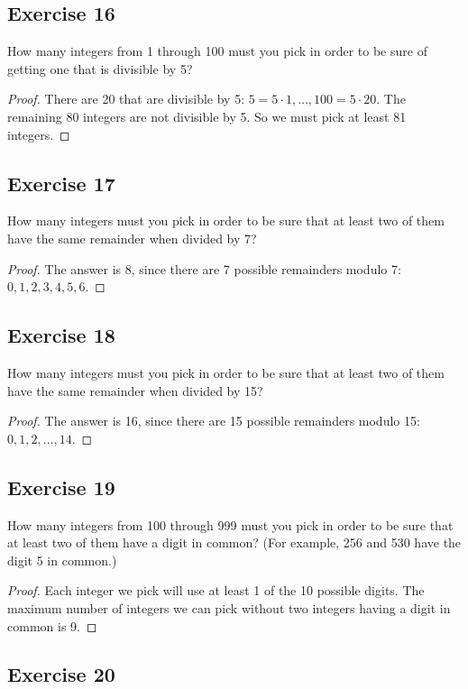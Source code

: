\documentclass[14pt]{extarticle}
\begin{document}
\subsection{Exercise 16}
How many integers from 1 through 100 must you pick in order to be sure of getting one that is divisible by 5?

\begin{proof}
There are 20 that are divisible by 5: \(5 = 5 \cdot 1, \ldots, 100 = 5 \cdot 20\). The remaining 80 integers are
not divisible by 5. So we must pick at least 81 integers.
\end{proof}

\subsection{Exercise 17}
How many integers must you pick in order to be sure that at least two of them have the same remainder when divided by 7?

\begin{proof}
The answer is 8, since there are 7 possible remainders modulo 7: \(0, 1, 2, 3, 4, 5, 6\).
\end{proof}

\subsection{Exercise 18}
How many integers must you pick in order to be sure that at least two of them have the same remainder when divided by 15?

\begin{proof}
The answer is 16, since there are 15 possible remainders modulo 15: \(0, 1, 2, \ldots, 14\).
\end{proof}

\subsection{Exercise 19}
How many integers from 100 through 999 must you pick in order to be sure that at least two of them have a digit in 
common? (For example, 256 and 530 have the digit 5 in common.)

\begin{proof}
Each integer we pick will use at least 1 of the 10 possible digits. The maximum number of integers we can pick without 
two integers having a digit in common is 9. 
\end{proof}

\subsection{Exercise 20}
\end{document}
